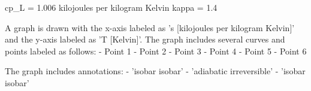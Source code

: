 cp_L = 1.006 kilojoules per kilogram Kelvin  
kappa = 1.4  

A graph is drawn with the x-axis labeled as 's [kilojoules per kilogram Kelvin]' and the y-axis labeled as 'T [Kelvin]'. The graph includes several curves and points labeled as follows:  
- Point 1  
- Point 2  
- Point 3  
- Point 4  
- Point 5  
- Point 6  

The graph includes annotations:  
- 'isobar isobar'  
- 'adiabatic irreversible'  
- 'isobar isobar'